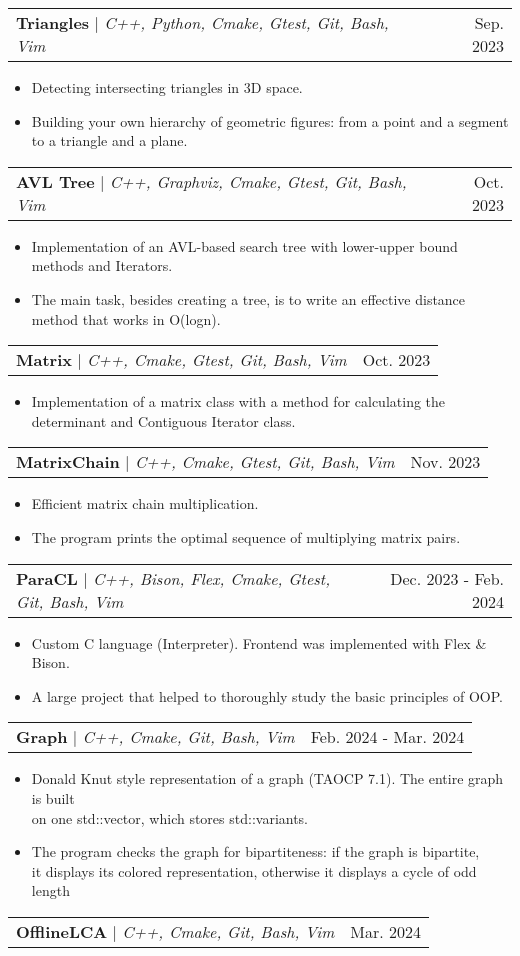\documentclass[letterpaper,11pt]{article}
\makeatletter
\newcommand{\resumeItem}[1]{
  \item\small{
    {#1 \vspace{-2pt}}
  }
}
\newcommand{\resumeProjectHeading}[2]{
    \item
    \begin{tabular*}{0.97\textwidth}{l@{\extracolsep{\fill}}r}
      \small#1 & #2 \\
    \end{tabular*}\vspace{-7pt}
}
\newcommand{\resumeItemListStart}{\begin{itemize}}
\newcommand{\resumeItemListEnd}{\end{itemize}\vspace{-5pt}}
\makeatother
\begin{document}
        \resumeProjectHeading
        {\textbf{Triangles} $|$ \footnotesize\emph{C++, Python, Cmake, Gtest, Git, Bash, Vim}}{Sep. 2023}
        \resumeItemListStart
            \resumeItem{Detecting intersecting triangles in 3D space.}
            \resumeItem{Building your own hierarchy of geometric figures: from a point and a segment to a triangle and a plane.}
          \resumeItemListEnd
      \resumeProjectHeading
        {\textbf{AVL Tree} $|$ \footnotesize\emph{C++, Graphviz, Cmake, Gtest, Git, Bash, Vim}}{Oct. 2023}
        \resumeItemListStart
            \resumeItem{Implementation of an AVL-based search tree with lower-upper bound methods and Iterators.}
            \resumeItem{The main task, besides creating a tree, is to write an effective distance method that works in O(logn).}
        \resumeItemListEnd
    \resumeProjectHeading
        {\textbf{Matrix} $|$ \footnotesize\emph{C++, Cmake, Gtest, Git, Bash, Vim}}{Oct. 2023}
        \resumeItemListStart
            \resumeItem{Implementation of a matrix class with a method for calculating the determinant and Contiguous Iterator class.}
        \resumeItemListEnd
    \resumeProjectHeading
        {\textbf{MatrixChain} $|$ \footnotesize\emph{C++, Cmake, Gtest, Git, Bash, Vim}}{Nov. 2023}
        \resumeItemListStart
            \resumeItem{Efficient matrix chain multiplication.}
            \resumeItem{The program prints the optimal sequence of multiplying matrix pairs.}
        \resumeItemListEnd
    \resumeProjectHeading
        {\textbf{ParaCL} $|$ \footnotesize\emph{C++, Bison, Flex, Cmake, Gtest, Git, Bash, Vim}}{Dec. 2023 - Feb. 2024}
        \resumeItemListStart
            \resumeItem{Custom C language (Interpreter). Frontend was implemented with Flex \& Bison.}
            \resumeItem{A large project that helped to thoroughly study the basic principles of OOP.}
        \resumeItemListEnd
    \resumeProjectHeading
        {\textbf{Graph} $|$ \footnotesize\emph{C++, Cmake, Git, Bash, Vim}}{Feb. 2024 - Mar. 2024}
        \resumeItemListStart
            \resumeItem{Donald Knut style representation of a graph (TAOCP 7.1). The entire graph is built \\ on one std::vector, which stores std::variants.}
            \resumeItem{The program checks the graph for bipartiteness: if the graph is bipartite,\\ it displays its colored representation, otherwise it displays a cycle of odd length}
        \resumeItemListEnd
    \resumeProjectHeading
        {\textbf{OfflineLCA} $|$ \footnotesize\emph{C++, Cmake, Git, Bash, Vim}}{Mar. 2024}
\end{document}
